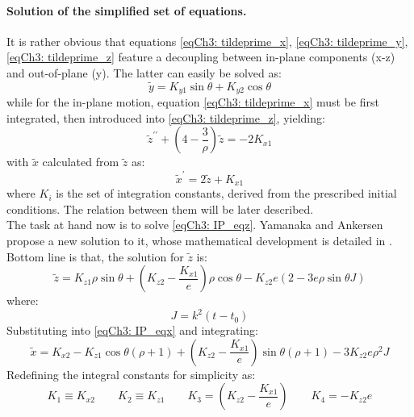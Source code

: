 	\paragraph{Solution of the simplified set of equations. \\}
	\indent It is rather obvious that equations \eqref{eqCh3: tildeprime_x}, \eqref{eqCh3: tildeprime_y}, \eqref{eqCh3: tildeprime_z} feature a decoupling between in-plane components (x-z) and out-of-plane (y). The latter can easily be solved as:
	\begin{equation}
	\widetilde{y} = K_{y1} \sin\theta + K_{y2} \cos\theta
	\label{eqCh3: OOP_sol}
	\end{equation}
	\noindent while for the in-plane motion, equation \eqref{eqCh3: tildeprime_x} must be first integrated, then introduced into \eqref{eqCh3: tildeprime_z}, yielding:
	\begin{equation}
	\widetilde{z}^{\prime\prime} + \left( 4 - \dfrac{3}{\rho} \right) \widetilde{z} = - 2 K_{x1}
	\label{eqCh3: IP_eqz}
	\end{equation} 
	\noindent with $\widetilde{x}$ calculated from $\widetilde{z}$ as:
	\begin{equation}
	\widetilde{x}^{\prime} = 2 \widetilde{z} + K_{x1}
	\label{eqCh3: IP_eqx}
	\end{equation}
	\noindent where $K_i$ is the set of integration constants, derived from the prescribed initial conditions. The relation between them will be later described.\\
	\indent The task at hand now is to solve \eqref{eqCh3: IP_eqz}. Yamanaka and Ankersen propose a new solution to it, whose mathematical development is detailed in  \cite{Yamanaka_Ankersen}. Bottom line is that, the solution for $\widetilde{z}$ is:
	\begin{equation}
	\widetilde{z} = K_{z1} \rho\sin\theta + \left(K_{z2} - \dfrac{K_{x1}}{e}\right) \rho\cos\theta - K_{z2} e\left(2 - 3 e\rho\sin\theta J\right)
	\label{eqCh3: z_tilde}
	\end{equation}
	\noindent where:
	\[
	J = k^2 (t - t_0)
	\]	
	\indent Substituting into \eqref{eqCh3: IP_eqx} and integrating:
	\begin{equation}
	\widetilde{x} = K_{x2} - K_{z1} \cos\theta \left(\rho + 1\right) + \left(K_{z2} - \dfrac{K_{x1}}{e}\right) \sin\theta \left(\rho + 1\right) - 3 K_{z2} e\rho^2 J
	\end{equation}	
	\indent Redefining the integral constants for simplicity as:
	\[
	K_1 \equiv K_{x2} \qquad K_2 \equiv K_{z1} \qquad K_3 = \left(K_{z2} - \dfrac{K_{x1}}{e}\right) \qquad K_{4} = - K_{z2} e
	\]
